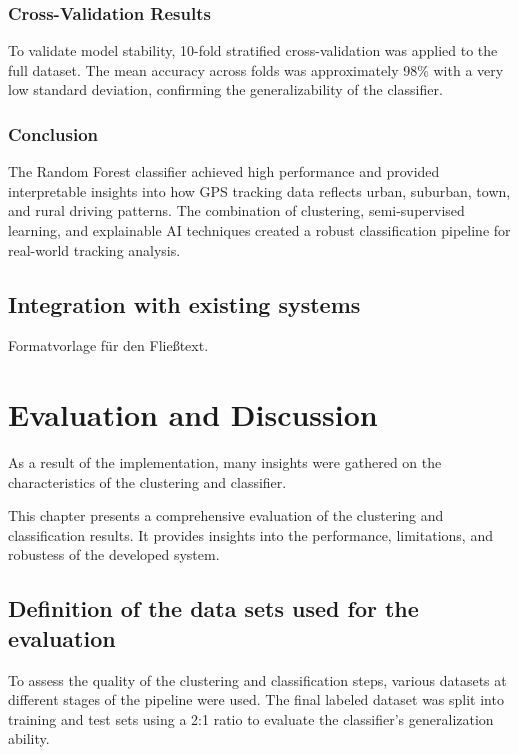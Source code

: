 \documentclass[a4paper,12pt,twoside]{scrreprt}
\begin{document}
\subsection{Cross-Validation Results}

To validate model stability, 10-fold stratified cross-validation was applied to
the full dataset. The mean accuracy across folds was approximately
98\% with a very low standard deviation, confirming the generalizability of the
classifier.

\subsection{Conclusion}

The Random Forest classifier achieved high performance and provided
interpretable insights into how GPS tracking data reflects urban, suburban,
town, and rural driving patterns. The combination of clustering,
semi-supervised learning, and explainable AI techniques created a robust
classification pipeline for real-world tracking analysis.

\section{Integration with existing systems}
Formatvorlage für den Fließtext.


\chapter{Evaluation and Discussion}

As a result of the implementation, many insights were gathered on the
characteristics of the clustering and classifier.

This chapter presents a comprehensive evaluation of the clustering and
classification results.
It provides insights into the performance, limitations, and robustess of the
developed system.

\section{Definition of the data sets used for the evaluation}

To assess the quality of the clustering and classification steps, various
datasets at different stages of the pipeline were used.
The final labeled dataset was split into training and test sets using a 2:1
ratio to evaluate the classifier's generalization ability.
\end{document}
